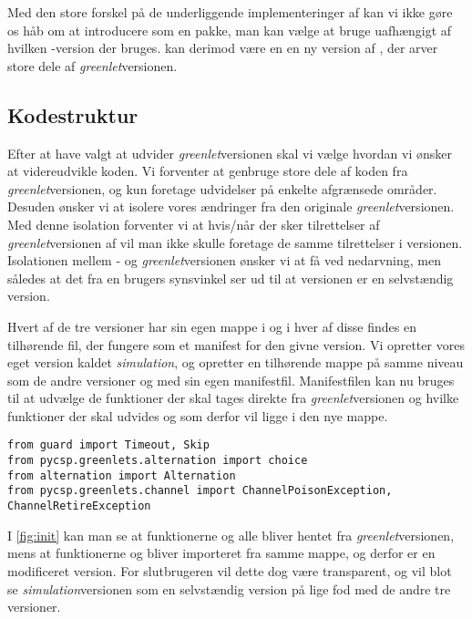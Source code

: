 Med den store forskel på de underliggende implementeringer af \csp kan vi ikke gøre os håb om at introducere \des som en pakke, man kan vælge at bruge uafhængigt af hvilken \pycsp-version  der bruges. \Des kan derimod være en en ny version af \pycsp, der arver store dele af \emph{greenlet}versionen. 

\subsection{Kodestruktur}  
Efter at have valgt at udvider \emph{greenlet}versionen skal vi vælge hvordan vi ønsker at videreudvikle koden. Vi forventer at genbruge store dele af koden fra \emph{greenlet}versionen, og kun foretage udvidelser på enkelte afgrænsede områder. Desuden ønsker vi at isolere vores ændringer fra den originale \emph{greenlet}versionen. Med denne isolation forventer vi at hvis/når der sker tilrettelser af \emph{greenlet}versionen af \pycsp vil man ikke skulle foretage de samme tilrettelser i \des versionen. 
Isolationen mellem \des- og \emph{greenlet}versionen ønsker vi at få ved nedarvning, men således at det fra en brugers synsvinkel ser ud til at \des versionen er en selvstændig version.

Hvert af de tre versioner har sin egen mappe i \pycsp og i hver af disse findes en tilhørende  fil, der fungere som et manifest for den givne version. Vi opretter vores eget version kaldet \emph{simulation}, og opretter en tilhørende mappe på samme niveau som de andre versioner og med sin egen manifestfil. Manifestfilen kan nu bruges til at udvælge de funktioner der skal tages direkte fra \emph{greenlet}versionen og hvilke funktioner der skal udvides og som derfor vil ligge i den nye mappe.
\begin{lstlisting}[float=hbtp,label=fig:init,caption=Uddrag af \code{\_\_init\_\_.py} for simulationsversionen.]
from guard import Timeout, Skip
from pycsp.greenlets.alternation import choice
from alternation import Alternation
from pycsp.greenlets.channel import ChannelPoisonException, ChannelRetireException
\end{lstlisting}

I \cref{fig:init} kan man se at funktionerne  og  alle bliver hentet fra \emph{greenlet}versionen, mens at funktionerne  og  bliver importeret fra samme mappe, og derfor er en modificeret version. For slutbrugeren  vil dette dog være transparent, og vil blot se \emph{simulation}versionen som en selvstændig version på lige fod med de andre tre versioner.

